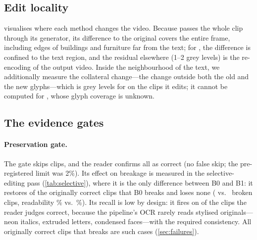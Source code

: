 \subsection{Edit locality}
\label{sec:exp_local}
 visualises where each method changes the video. Because \steer passes the whole clip through its generator, its difference to the original covers the entire frame, including edges of buildings and furniture far from the text; for \method, the difference is confined to the text region, and the residual elsewhere (1--2 grey levels) is the re-encoding of the output video. Inside the neighbourhood of the text, we additionally measure the collateral change---the change outside both the old and the new glyphs---which is \rOursCollat{} grey levels for \method on the \rOursCollatN{} clips it edits; it cannot be computed for \steer, whose glyph coverage is unknown.

\subsection{The evidence gates}
\label{sec:exp_gates}
\paragraph{Preservation gate.} The gate skips \rSkipped{} clips, and the reader confirms all \rSkippedOK{} as correct (no false skip; the pre-registered limit was 2\%). Its effect on breakage is measured in the selective-editing pass (\cref{tab:selective}), where it is the only difference between B0 and B1: it restores \sRestored{} of the \sBrokenBzero{} originally correct clips that B0 breaks and loses none (\sBrokenBzero{} vs.\ \sBrokenBone{} broken clips, readability \sReadBzero\% vs.\ \sReadBone\%). Its recall is low by design: it fires on \rSkipped{} of the \rOrigCorrect{} clips the reader judges correct, because the pipeline's OCR rarely reads stylised originals---neon italics, extruded letters, condensed faces---with the required consistency. All \rOursBroken{} originally correct clips that \method breaks are such cases (\cref{sec:failures}).














